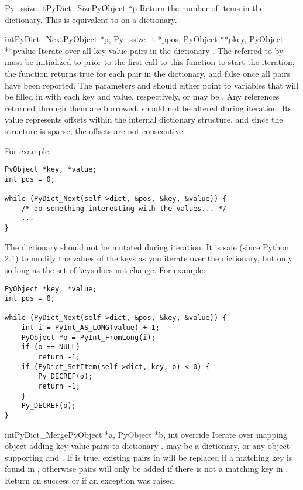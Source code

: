 \begin{cfuncdesc}{Py_ssize_t}{PyDict_Size}{PyObject *p}
  Return the number of items in the dictionary.  This is equivalent
  to  on a dictionary.
\end{cfuncdesc}

\begin{cfuncdesc}{int}{PyDict_Next}{PyObject *p, Py_ssize_t *ppos,
                                    PyObject **pkey, PyObject **pvalue}
  Iterate over all key-value pairs in the dictionary .  The
   referred to by  must be initialized to
   prior to the first call to this function to start the
  iteration; the function returns true for each pair in the
  dictionary, and false once all pairs have been reported.  The
  parameters  and  should either point to
   variables that will be filled in with each key and
  value, respectively, or may be \NULL{}.  Any references returned through
  them are borrowed.   should not be altered during iteration.
  Its value represents offsets within the internal dictionary structure,
  and since the structure is sparse, the offsets are not consecutive.

  For example:

\begin{verbatim}
PyObject *key, *value;
int pos = 0;

while (PyDict_Next(self->dict, &pos, &key, &value)) {
    /* do something interesting with the values... */
    ...
}
\end{verbatim}

  The dictionary  should not be mutated during iteration.  It
  is safe (since Python 2.1) to modify the values of the keys as you
  iterate over the dictionary, but only so long as the set of keys
  does not change.  For example:

\begin{verbatim}
PyObject *key, *value;
int pos = 0;

while (PyDict_Next(self->dict, &pos, &key, &value)) {
    int i = PyInt_AS_LONG(value) + 1;
    PyObject *o = PyInt_FromLong(i);
    if (o == NULL)
        return -1;
    if (PyDict_SetItem(self->dict, key, o) < 0) {
        Py_DECREF(o);
        return -1;
    }
    Py_DECREF(o);
}
\end{verbatim}
\end{cfuncdesc}

\begin{cfuncdesc}{int}{PyDict_Merge}{PyObject *a, PyObject *b, int override}
  Iterate over mapping object  adding key-value pairs to dictionary
  .
   may be a dictionary, or any object supporting
   and .
  If  is true, existing pairs in  will
  be replaced if a matching key is found in , otherwise pairs
  will only be added if there is not a matching key in .
  Return  on success or  if an exception was
  raised.
\end{cfuncdesc}

